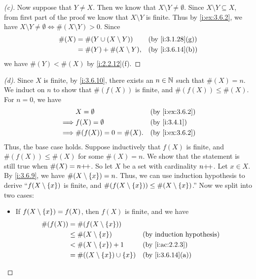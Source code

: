 \begin{proof}[(c)]
  Now suppose that \(Y \neq X\).
  Then we know that \(X \setminus Y \neq \emptyset\).
  Since \(X \setminus Y \subseteq X\), from first part of the proof we know that \(X \setminus Y\) is finite.
  Thus by \cref{i:ex:3.6.2}, we have \(X \setminus Y \neq \emptyset \iff \#(X \setminus Y) > 0\).
  Since
  \begin{align*}
    \#(X) & = \#(Y \cup (X \setminus Y)) &  & \by{i:3.1.28}[g] \\
          & = \#(Y) + \#(X \setminus Y), &  & \by{i:3.6.14}[b]
  \end{align*}
  we have \(\#(Y) < \#(X)\) by \cref{i:2.2.12}(f).
\end{proof}

\begin{proof}[(d)]
  Since \(X\) is finite, by \cref{i:3.6.10}, there exists an \(n \in \mathbb{N}\) such that \(\#(X) = n\).
  We induct on \(n\) to show that \(\#(f(X))\) is finite, and \(\#(f(X)) \leq \#(X)\).
  For \(n = 0\), we have
  \begin{align*}
             & X = \emptyset         &  & \by{i:ex:3.6.2} \\
    \implies & f(X) = \emptyset      &  & \by{i:3.4.1}    \\
    \implies & \#(f(X)) = 0 = \#(X). &  & \by{i:ex:3.6.2}
  \end{align*}
  Thus, the base case holds.
  Suppose inductively that \(f(X)\) is finite, and \(\#(f(X)) \leq \#(X)\) for some \(\#(X) = n\).
  We show that the statement is still true when \(\#(X) = n{+}\!{+}\).
  So let \(X\) be a set with cardinality \(n{+}\!{+}\).
  Let \(x \in X\).
  By \cref{i:3.6.9}, we have \(\#(X \setminus \left\lbrace x\right\rbrace) = n\).
  Thus, we can use induction hypothesis to derive ``\(f(X \setminus \left\lbrace x\right\rbrace)\) is finite, and \(\#(f(X \setminus \left\lbrace x\right\rbrace)) \leq \#(X \setminus \left\lbrace x\right\rbrace)\).''
  Now we split into two cases:
  \begin{itemize}
    \item If \(f(X \setminus \left\lbrace x\right\rbrace) = f(X)\), then \(f(X)\) is finite, and we have
          \begin{align*}
            \#(f(X)) & = \#(f(X \setminus \set{x}))                                   \\
                     & \leq \#(X \setminus \set{x})             &  & \byIH            \\
                     & < \#(X \setminus \set{x}) + 1            &  & \by{i:ac:2.2.3}  \\
                     & = \#((X \setminus \set{x}) \cup \set{x}) &  & \by{i:3.6.14}[a] \\

\end{align*}
\end{itemize}
\end{proof}
